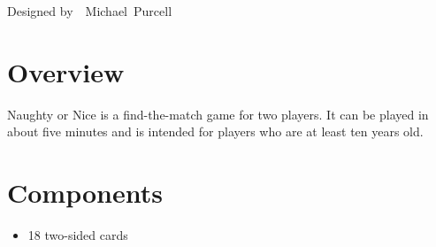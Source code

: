 \documentclass[11pt, parskip=half]{scrartcl}
\begin{document}
\begin{titlepage}
\begin{center}

\vfill

\setmainfont[Scale=2.75]{Berkshire Swash}
\tiny
\textcolor{XmasGreen}{Designed by\ \ Michael\ Purcell}
\end{center}
\end{titlepage}
\pagecolor{white}

\setmainfont{Tex Gyre Schola}
\ClearShipoutPicture

\section*{Overview}
Naughty or Nice is a find-the-match game for two players. It can be played in about five minutes and is intended for players who are at least ten years old.

\section*{Components}
\begin{itemize}[leftmargin=*, nosep]
  \item 18 two-sided cards 
\end{itemize}
\end{document}

